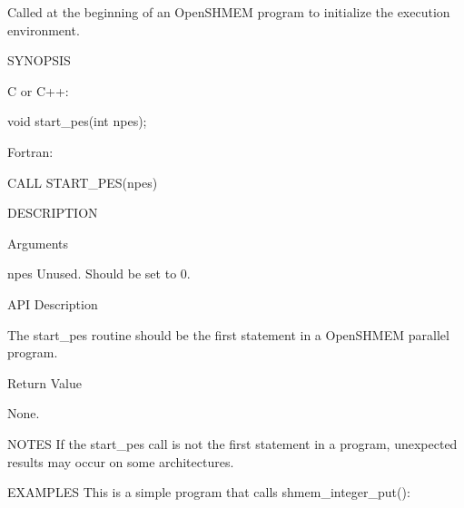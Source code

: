        Called  at the beginning of an OpenSHMEM program to initialize
       the execution environment.

SYNOPSIS

       C or C++:

	  void start_pes(int npes);

       Fortran:

	  CALL START_PES(npes)

DESCRIPTION

Arguments

       npes	 Unused.  Should be set to 0.

API Description

       The start_pes routine should be the first statement in a OpenSHMEM parallel
       program.

Return Value

	None.

NOTES
       If  the	start_pes  call	 is  not  the  first  statement	 in a program,
       unexpected results may occur on some architectures.


EXAMPLES
       This is a simple program that calls shmem_integer_put():

	

